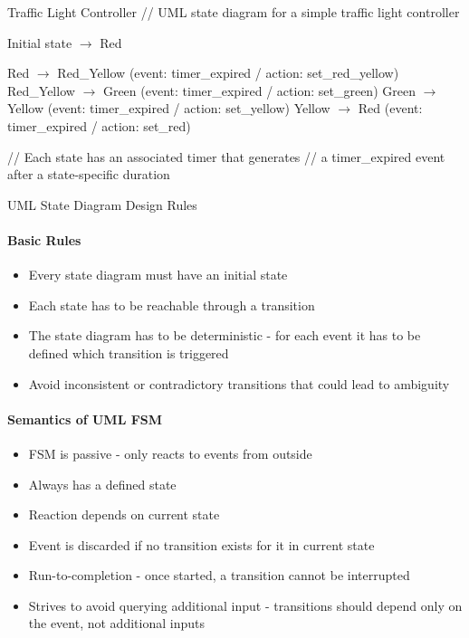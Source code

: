 \begin{examplecode}{Traffic Light Controller}
// UML state diagram for a simple traffic light controller

Initial state $\rightarrow$ Red

Red $\rightarrow$ Red\_Yellow (event: timer\_expired / action: set\_red\_yellow)
Red\_Yellow $\rightarrow$ Green (event: timer\_expired / action: set\_green)
Green $\rightarrow$ Yellow (event: timer\_expired / action: set\_yellow) 
Yellow $\rightarrow$ Red (event: timer\_expired / action: set\_red)

// Each state has an associated timer that generates 
// a timer\_expired event after a state-specific duration
\end{examplecode}

\begin{KR}{UML State Diagram Design Rules}
\paragraph{Basic Rules}
\begin{itemize}
    \item Every state diagram must have an initial state
    \item Each state has to be reachable through a transition
    \item The state diagram has to be deterministic - for each event it has to be defined which transition is triggered
    \item Avoid inconsistent or contradictory transitions that could lead to ambiguity
\end{itemize}

\paragraph{Semantics of UML FSM}
\begin{itemize}
    \item FSM is passive - only reacts to events from outside
    \item Always has a defined state
    \item Reaction depends on current state
    \item Event is discarded if no transition exists for it in current state
    \item Run-to-completion - once started, a transition cannot be interrupted
    \item Strives to avoid querying additional input - transitions should depend only on the event, not additional inputs
\end{itemize}
\end{KR}

